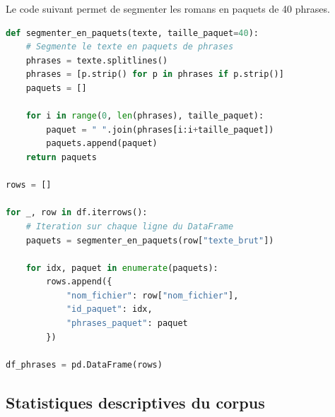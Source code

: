 \documentclass{article}
\begin{document}
\vspace{0.3cm}
Le code suivant permet de segmenter les romans en paquets de 40 phrases.
\vspace{0.3cm}
\begin{lstlisting}[language=Python, caption={Code de segmentation du texte en paquets de phrases}]
def segmenter_en_paquets(texte, taille_paquet=40):
    # Segmente le texte en paquets de phrases
    phrases = texte.splitlines()
    phrases = [p.strip() for p in phrases if p.strip()]
    paquets = []

    for i in range(0, len(phrases), taille_paquet):
        paquet = " ".join(phrases[i:i+taille_paquet])
        paquets.append(paquet)
    return paquets

rows = []

for _, row in df.iterrows():
    # Iteration sur chaque ligne du DataFrame
    paquets = segmenter_en_paquets(row["texte_brut"])

    for idx, paquet in enumerate(paquets):
        rows.append({
            "nom_fichier": row["nom_fichier"],
            "id_paquet": idx,
            "phrases_paquet": paquet
        })

df_phrases = pd.DataFrame(rows)
\end{lstlisting}

\subsection{Statistiques descriptives du corpus}
\end{document}
